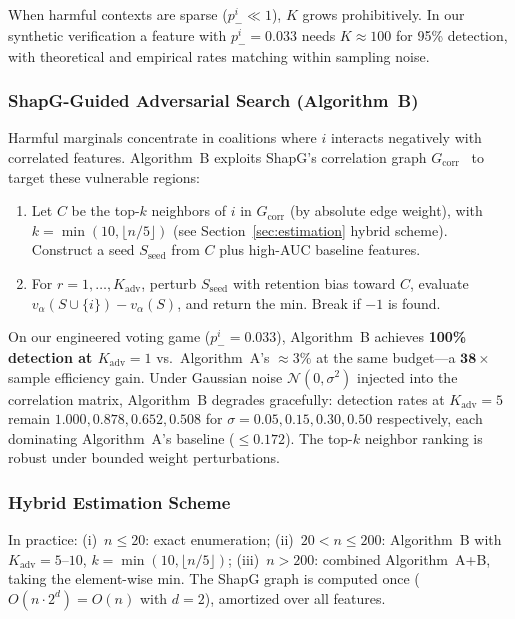 \documentclass{article} %
\begin{document}
When harmful contexts are sparse ($p_-^i \ll 1$), $K$ grows prohibitively. In our synthetic verification a feature with $p_-^i = 0.033$ needs $K\approx 100$ for 95\% detection, with theoretical and empirical rates matching within sampling noise.

\subsubsection{ShapG-Guided Adversarial Search (Algorithm~B)}

Harmful marginals concentrate in coalitions where $i$ interacts negatively with correlated features. Algorithm~B exploits ShapG's correlation graph $G_{\text{corr}}$~\citep{zhao2025shapg} to target these vulnerable regions:

\begin{enumerate}
\item Let $C$ be the top-$k$ neighbors of $i$ in $G_{\text{corr}}$ (by absolute edge weight), with $k = \min(10, \lfloor n/5\rfloor)$ (see Section~\ref{sec:estimation} hybrid scheme). Construct a seed $S_{\text{seed}}$ from $C$ plus high-AUC baseline features.
\item For $r=1,\dots,K_{\text{adv}}$, perturb $S_{\text{seed}}$ with retention bias toward $C$, evaluate $v_\alpha(S\cup\{i\})-v_\alpha(S)$, and return the min. Break if $-1$ is found.
\end{enumerate}

On our engineered voting game ($p_-^i=0.033$), Algorithm~B achieves \textbf{100\% detection at $K_{\text{adv}}=1$} vs.\ Algorithm~A's $\approx 3\%$ at the same budget---a $\mathbf{38\times}$ sample efficiency gain. Under Gaussian noise $\mathcal{N}(0,\sigma^2)$ injected into the correlation matrix, Algorithm~B degrades gracefully: detection rates at $K_{\text{adv}}=5$ remain $1.000, 0.878, 0.652, 0.508$ for $\sigma = 0.05, 0.15, 0.30, 0.50$ respectively, each dominating Algorithm~A's baseline ($\leq 0.172$). The top-$k$ neighbor ranking is robust under bounded weight perturbations.

\subsubsection{Hybrid Estimation Scheme}

In practice: (i)~$n \leq 20$: exact enumeration; (ii)~$20 < n \leq 200$: Algorithm~B with $K_{\text{adv}}=5$--$10$, $k=\min(10,\lfloor n/5\rfloor)$; (iii)~$n > 200$: combined Algorithm~A+B, taking the element-wise min. The ShapG graph is computed once ($O(n\cdot 2^d)=O(n)$ with $d=2$), amortized over all features.
\end{document}

